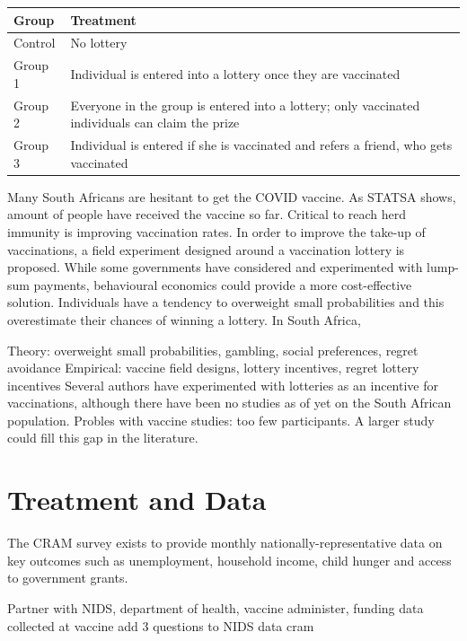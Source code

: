 \documentclass[11pt,preprint, authoryear]{elsarticle}
\let\origtable\table
\let\endorigtable\endtable
\renewenvironment{table}[1][2] {
    \expandafter\origtable\expandafter[H]
} {
    \endorigtable
}
\numberwithin{equation}{section}
\numberwithin{figure}{section}
\numberwithin{table}{section}
\begin{document}
\begin{table}[H]
\centering
\begin{tabular}{ll}
  \toprule
Group & Treatment \\ 
  \midrule
Control & No lottery \\ 
  Group 1 & Individual is entered into a lottery once they are vaccinated \\ 
  Group 2 & Everyone in the group is entered into a lottery; only vaccinated individuals can claim the prize \\ 
  Group 3 & Individual is entered if she is vaccinated and refers a friend, who gets vaccinated \\ 
   \bottomrule
\end{tabular}
\caption{Treatment Summary \label{tab2}} 
\end{table}

Many South Africans are hesitant to get the COVID vaccine. As STATSA
shows, amount of people have received the vaccine so far. Critical to
reach herd immunity is improving vaccination rates. In order to improve
the take-up of vaccinations, a field experiment designed around a
vaccination lottery is proposed. While some governments have considered
and experimented with lump-sum payments, behavioural economics could
provide a more cost-effective solution. Individuals have a tendency to
overweight small probabilities and this overestimate their chances of
winning a lottery. In South Africa,

Theory: overweight small probabilities, gambling, social preferences,
regret avoidance Empirical: vaccine field designs, lottery incentives,
regret lottery incentives Several authors have experimented with
lotteries as an incentive for vaccinations, although there have been no
studies as of yet on the South African population. Probles with vaccine
studies: too few participants. A larger study could fill this gap in the
literature.

\hypertarget{treatment-and-data}{%
\section{\texorpdfstring{Treatment and Data
\label{treat}}{Treatment and Data }}\label{treatment-and-data}}

The CRAM survey exists to provide monthly nationally-representative data
on key outcomes such as unemployment, household income, child hunger and
access to government grants.

Partner with NIDS, department of health, vaccine administer, funding
data collected at vaccine add 3 questions to NIDS data cram
\end{document}
